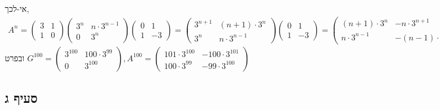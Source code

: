 \documentclass{article}
\begin{document}
אי-לכך,
\begin{align*}
    A^n = \begin{pmatrix}
              3 & 1 \\
              1 & 0
          \end{pmatrix}\begin{pmatrix}
                           3^n & n \cdot 3^{n-1} \\
                           0   & 3^n
                       \end{pmatrix}\begin{pmatrix}
                                        0 & 1  \\
                                        1 & -3
                                    \end{pmatrix}=\begin{pmatrix}
                                                      3^{n+1} & (n+1) \cdot 3^n \\
                                                      3^n     & n\cdot 3^{n-1}
                                                  \end{pmatrix}\begin{pmatrix}
                                                                   0 & 1  \\
                                                                   1 & -3
                                                               \end{pmatrix}=\begin{pmatrix}
                                                                                 (n+1) \cdot 3^n & -n \cdot 3^{n+1} \\
                                                                                 n \cdot 3^{n-1} & -(n-1) \cdot 3^n
                                                                             \end{pmatrix}
\end{align*}
ובפרט $G^{100}=\begin{pmatrix}
        3^{100} & 100 \cdot 3^{99} \\
        0       & 3^{100}
    \end{pmatrix}, A^{100}=\begin{pmatrix}
        101 \cdot 3^{100} & -100 \cdot 3^{101} \\
        100 \cdot 3^{99}  & -99 \cdot 3^{100}
    \end{pmatrix}$

\subsection*{סעיף ג}
\end{document}
